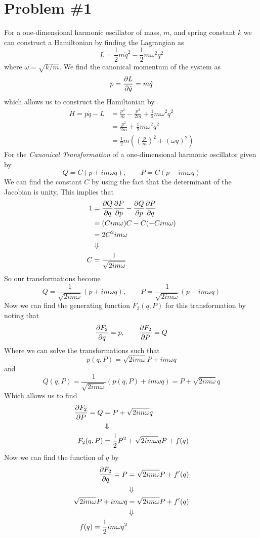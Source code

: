 \documentclass[11pt]{article}
\numberwithin{equation}{section}
\begin{document}


\section{Problem \#1}
For a one-dimensional harmonic oscillator of mass, $m$, and spring constant $k$ we can 
construct a Hamiltonian by finding the Lagrangian as
$$L = \frac{1}{2}m\dot{q}^2 - \frac{1}{2}m\omega^2q^2$$
where $\omega = \sqrt{k/m}$. We find the canonical momentum of the system as
$$p = \frac{\partial{L}}{\partial{\dot{q}}} = m\dot{q}$$
which allows us to construct the Hamiltonian by
\begin{align*}
H = p\dot{q} - L  &= \frac{p^2}{m} - \frac{p^2}{2m} + \frac{1}{2}m\omega^2q^2\\
&= \frac{p^2}{2m} + \frac{1}{2}m\omega^2q^2\\
&= \frac{1}{2}m\left(\left(\frac{p}{m}\right)^2 + (\omega{q})^2\right)
\end{align*}
For the \emph{Canonical Transformation} of a one-dimensional harmonic oscillator given by
$$Q = C(p+im\omega{q}), \qquad P = C(p-im\omega{q})$$
We can find the constant $C$ by using the fact that the determinant of the Jacobian is unity. 
This implies that
\begin{align*}
1 &= \frac{\partial{Q}}{\partial{q}}\frac{\partial{P}}{\partial{p}} - \frac{\partial{Q}}{\partial{p}}\frac{\partial{P}}{\partial{q}}\\
&= (Cim\omega)C - C(-Cim\omega)\\
&= 2C^2im\omega\\
&\Downarrow\\
C &= \frac{1}{\sqrt{2im\omega}}
\end{align*}
So our transformations become
$$Q = \frac{1}{\sqrt{2im\omega}}(p+im\omega{q}), \qquad P = \frac{1}{\sqrt{2im\omega}}(p-im\omega{q})$$
Now we can find the generating function $F_2(q,P)$ for this transformation by noting that
$$\frac{\partial{F_2}}{\partial{q}} = p, \qquad \frac{\partial{F_2}}{\partial{P}} = Q$$
Where we can solve the transformations such that
$$p(q,P) = \sqrt{2im\omega}P+im\omega{q}$$
and
$$Q(q,P) = \frac{1}{\sqrt{2im\omega}}(p(q,P)+im\omega{q}) = P +\sqrt{2im\omega}{q}$$
Which allows us to find 
\begin{align*}
\frac{\partial{F_2}}{\partial{P}} = Q  &= P +\sqrt{2im\omega}{q}\\
&\Downarrow\\
F_2(q,P) &= \frac{1}{2}P^2 +\sqrt{2im\omega}{q}P + f(q)
\end{align*}
Now we can find the function of $q$ by
\begin{align*}
\frac{\partial{F_2}}{\partial{q}} = P  &= \sqrt{2im\omega}P + f'(q)\\
&\Downarrow\\
\sqrt{2im\omega}P+im\omega{q} &= \sqrt{2im\omega}P + f'(q)\\
&\Downarrow\\
f(q) = \frac{1}{2}im\omega{q^2}
\end{align*}
\end{document}
